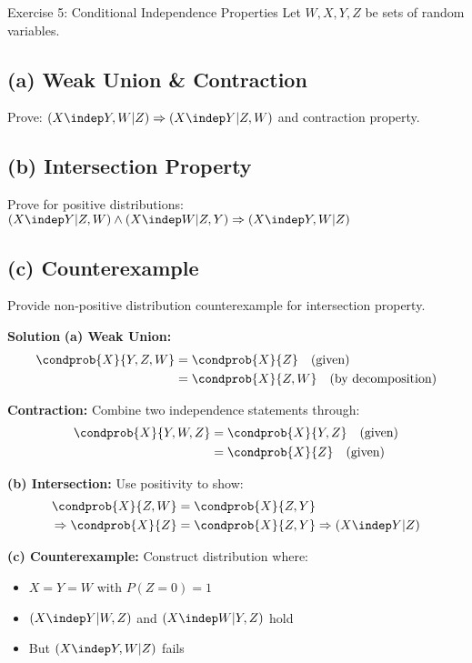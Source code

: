 \documentclass[11pt,a4paper]{article}
\newenvironment{solution}
    {\par\medskip\noindent\textbf{\color{UMBlue}Solution}\quad\color{DarkGray}}
    {\par\medskip}
\begin{document}
\begin{exercisebox}{Exercise 5: Conditional Independence Properties}
Let $W, X, Y, Z$ be sets of random variables.

\subsection*{(a) Weak Union \& Contraction}
Prove: $(X \indep Y,W | Z) \Rightarrow (X \indep Y | Z,W)$ and contraction property.

\subsection*{(b) Intersection Property}
Prove for positive distributions: $(X \indep Y | Z,W) \land (X \indep W | Z,Y) \Rightarrow (X \indep Y,W | Z)$

\subsection*{(c) Counterexample}
Provide non-positive distribution counterexample for intersection property.

\begin{solution}
\textbf{(a) Weak Union:}
\begin{align*}
\condprob{X}{Y,Z,W} &= \condprob{X}{Z} \quad \text{(given)} \\
&= \condprob{X}{Z,W} \quad \text{(by decomposition)}
\end{align*}

\textbf{Contraction:} Combine two independence statements through:
\begin{align*}
\condprob{X}{Y,W,Z} &= \condprob{X}{Y,Z} \quad \text{(given)} \\
&= \condprob{X}{Z} \quad \text{(given)}
\end{align*}

\textbf{(b) Intersection:} Use positivity to show:
\begin{align*}
\condprob{X}{Z,W} &= \condprob{X}{Z,Y} \\
\Rightarrow \condprob{X}{Z} &= \condprob{X}{Z,Y} \Rightarrow (X \indep Y | Z)
\end{align*}

\textbf{(c) Counterexample:} Construct distribution where:
\begin{itemize}
\item $X=Y=W$ with $P(Z=0)=1$
\item $(X \indep Y | W,Z)$ and $(X \indep W | Y,Z)$ hold
\item But $(X \indep Y,W | Z)$ fails
\end{itemize}
\end{solution}
\end{exercisebox}
\end{document}
